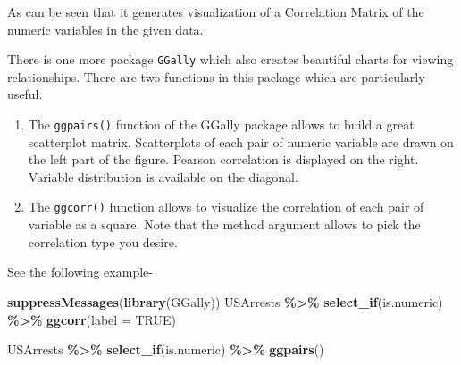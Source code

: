 \documentclass[
]{book}
\newenvironment{Shaded}{\begin{snugshade}}{\end{snugshade}}
\newcommand{\AttributeTok}[1]{\textcolor[rgb]{0.13,0.29,0.53}{#1}}
\newcommand{\ConstantTok}[1]{\textcolor[rgb]{0.56,0.35,0.01}{#1}}
\newcommand{\FunctionTok}[1]{\textcolor[rgb]{0.13,0.29,0.53}{\textbf{#1}}}
\newcommand{\NormalTok}[1]{#1}
\newcommand{\SpecialCharTok}[1]{\textcolor[rgb]{0.81,0.36,0.00}{\textbf{#1}}}
\begin{document}
As can be seen that it generates visualization of a Correlation Matrix of the numeric variables in the given data.

There is one more package \texttt{GGally} which also creates beautiful charts for viewing relationships. There are two functions in this package which are particularly useful.

\begin{enumerate}
\def\labelenumi{\arabic{enumi}.}
\item
  The \texttt{ggpairs()} function of the GGally package allows to build a great scatterplot matrix. Scatterplots of each pair of numeric variable are drawn on the left part of the figure. Pearson correlation is displayed on the right. Variable distribution is available on the diagonal.
\item
  The \texttt{ggcorr()} function allows to visualize the correlation of each pair of variable as a square. Note that the method argument allows to pick the correlation type you desire.
\end{enumerate}

See the following example-

\begin{Shaded}
\begin{Highlighting}[]
\FunctionTok{suppressMessages}\NormalTok{(}\FunctionTok{library}\NormalTok{(GGally))}
\NormalTok{USArrests }\SpecialCharTok{\%\textgreater{}\%} 
  \FunctionTok{select\_if}\NormalTok{(is.numeric) }\SpecialCharTok{\%\textgreater{}\%} 
  \FunctionTok{ggcorr}\NormalTok{(}\AttributeTok{label =} \ConstantTok{TRUE}\NormalTok{)}

\NormalTok{USArrests }\SpecialCharTok{\%\textgreater{}\%} 
  \FunctionTok{select\_if}\NormalTok{(is.numeric) }\SpecialCharTok{\%\textgreater{}\%}
  \FunctionTok{ggpairs}\NormalTok{()}
\end{Highlighting}
\end{Shaded}
\end{document}
